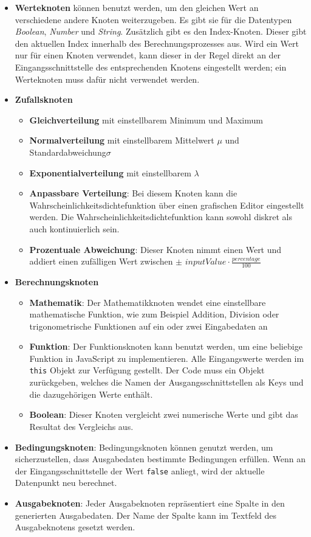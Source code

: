 \begin{itemize}
    \item \textbf{Werteknoten} können benutzt werden, um den gleichen Wert an verschiedene andere Knoten weiterzugeben. Es gibt sie für die Datentypen \textit{Boolean}, \textit{Number} und \textit{String}. Zusätzlich gibt es den Index-Knoten. Dieser gibt den aktuellen Index innerhalb des Berechnungsprozesses aus. Wird ein Wert nur für einen Knoten verwendet, kann dieser in der Regel direkt an der Eingangsschnittstelle des entsprechenden Knotens eingestellt werden; ein Werteknoten muss dafür nicht verwendet werden.
    \item \textbf{Zufallsknoten}
    \begin{itemize}
        \item \textbf{Gleichverteilung} mit einstellbarem Minimum und Maximum
        \item \textbf{Normalverteilung} mit einstellbarem Mittelwert $\mu$ und Standardabweichung\nobreakspace $\sigma$
        \item \textbf{Exponentialverteilung} mit einstellbarem $\lambda$
        \item \textbf{Anpassbare Verteilung}: Bei diesem Knoten kann die Wahrscheinlichkeitsdichtefunktion über einen grafischen Editor eingestellt werden. Die Wahrscheinlichkeitsdichtefunktion kann sowohl diskret als auch kontinuierlich sein.
        \item \textbf{Prozentuale Abweichung}: Dieser Knoten nimmt einen Wert und addiert einen zufälligen Wert zwischen $\pm \, \, inputValue \cdot \frac{percentage}{100}$
    \end{itemize}
    \item \textbf{Berechnungsknoten}
    \begin{itemize}
        \item \textbf{Mathematik}: Der Mathematikknoten wendet eine einstellbare mathematische Funktion, wie zum Beispiel Addition, Division oder trigonometrische Funktionen auf ein oder zwei Eingabedaten an
        \item \textbf{Funktion}: Der Funktionsknoten kann benutzt werden, um eine beliebige Funktion in JavaScript zu implementieren. Alle Eingangswerte werden im \texttt{this} Objekt zur Verfügung gestellt. Der Code muss ein Objekt zurückgeben, welches die Namen der Ausgangsschnittstellen als Keys und die dazugehörigen Werte enthält.
        \item \textbf{Boolean}: Dieser Knoten vergleicht zwei numerische Werte und gibt das Resultat des Vergleichs aus.
    \end{itemize}
    \item \textbf{Bedingungsknoten}: Bedingungsknoten können genutzt werden, um sicherzustellen, dass Ausgabedaten bestimmte Bedingungen erfüllen. Wenn an der Eingangsschnittstelle der Wert \texttt{false} anliegt, wird der aktuelle Datenpunkt neu berechnet.
    \item \textbf{Ausgabeknoten}: Jeder Ausgabeknoten repräsentiert eine Spalte in den generierten Ausgabedaten. Der Name der Spalte kann im Textfeld des Ausgabeknotens gesetzt werden.
\end{itemize}

